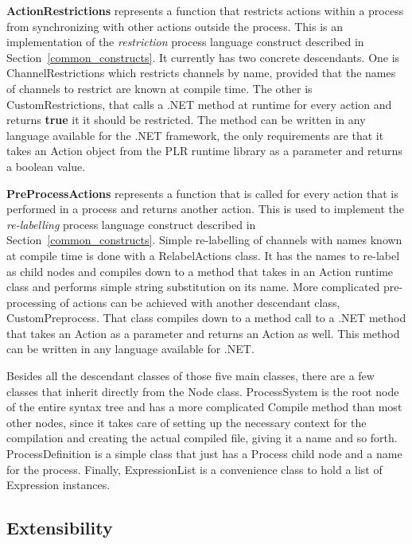  	\textbf{ActionRestrictions} represents a function that restricts actions 
 	within a process from synchronizing with other actions outside the process. 
 	This is an implementation of the \textit{restriction} process language 
 	construct described in Section~\ref{common_constructs}. It currently has two 
 	concrete descendants. One is \textsf{ChannelRestrictions} which restricts 
 	channels by name, provided that the names of channels to restrict are known 
 	at compile time. The other is \textsf{CustomRestrictions}, that calls a .NET 
 	method at runtime for every action and returns \textbf{true} it it should be 
 	restricted. The method can be written in any language available for the .NET 
 	framework, the only requirements are that it takes an \textsf{Action} object 
 	from the PLR runtime library as a parameter and returns a boolean value.
	 
 	\textbf{PreProcessActions} represents a function that is called for every 
 	action that is performed in a process and returns another action. This is 
 	used to implement the \textit{re-labelling} process language construct 
 	described in Section~\ref{common_constructs}. Simple re-labelling of 
 	channels with names known at compile time is done with a 
 	\textsf{RelabelActions} class. It has the names to re-label as child nodes 
 	and compiles down to a method that takes in an \textsf{Action} runtime class 
 	and performs simple string substitution on its name. More complicated 
 	pre-processing of actions can be achieved with another descendant class, 
 	\textsf{CustomPreprocess}. That class compiles down to a method call to a 
 	.NET method that takes an \textsf{Action} as a parameter and returns an 
 	\textsf{Action} as well. This method can be written in any language 
 	available for .NET.
 	
 	Besides all the descendant classes of those five main classes, there are a 
 	few classes that inherit directly from the \textsf{Node} class. 
 	\textsf{ProcessSystem} is the root node of the entire syntax tree and has a 
 	more complicated \textsf{Compile} method than most other nodes, since it 
 	takes care of setting up the necessary context for the compilation and 
 	creating the actual compiled file, giving it a name and so forth. 
 	\textsf{ProcessDefinition} is a simple class that just has a 
 	\textsf{Process} child node and a name for the process. Finally, 
 	\textsf{ExpressionList} is a convenience class to hold a list of 
 	\textsf{Expression} instances.
 	
\subsection{Extensibility}
	
